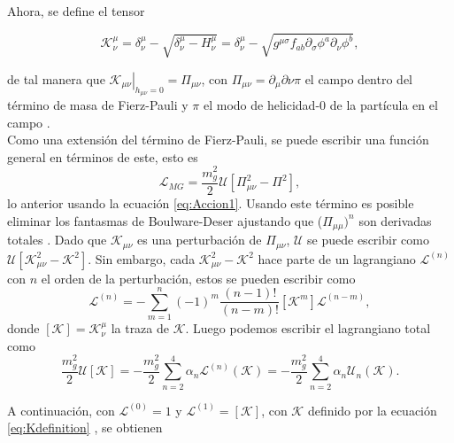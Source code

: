 Ahora, se define el tensor

\begin{equation}
    \mathcal{K}^\mu_\nu=\delta^\mu_\nu-\sqrt{\delta^\mu_\nu-H^\mu_\nu}=\delta^\mu_\nu-\sqrt{g^{\mu\sigma}f_{ab}\partial_\sigma\phi^a\partial_{\nu}\phi^{b}},\label{eq:Kdefinition}
\end{equation}

de tal manera que $\left.\mathcal{K}_{\mu\nu}\right|_{h_{\mu\nu}=0}=\Pi_{\mu\nu}$, con $\Pi_{\mu\nu}=\partial_\mu\partial\nu\pi$ el campo dentro del término de  masa de Fierz-Pauli y $\pi$ el modo de helicidad-0 de la partícula en el campo \cite{ResummationOfMG,GeneralizationOfFP}.\\

Como una extensión del término de Fierz-Pauli, se puede escribir una función general en términos de este, esto es
\begin{equation}
    \mathcal{L}_{MG}=\dfrac{m_g^2}{2}\mathcal{U}[\Pi_{\mu\nu}^2-\Pi^2],
\end{equation}
lo anterior usando la ecuación \eqref{eq:Accion1}. Usando este término es posible eliminar los fantasmas de Boulware-Deser ajustando que ($\Pi_{\mu\mu})^n$ son derivadas totales \cite{MassiveGravity}. Dado que $\mathcal{K}_{\mu\nu}$ es una perturbación de $\Pi_{\mu\nu}$, $\mathcal{U}$ se puede escribir como $\mathcal{U}[\mathcal{K}_{\mu\nu}^2-\mathcal{K}^2]$. Sin embargo, cada $\mathcal{K}_{\mu\nu}^2-\mathcal{K}^2$ hace parte de un lagrangiano $\mathcal{L}^{(n)}$ con $n$ el orden de la perturbación, estos se pueden escribir como \cite{GeneralizationOfFP}
\begin{equation}
    \mathcal{L}^{(n)}=-\sum\limits_{m=1}^n(-1)^m\dfrac{(n-1)!}{(n-m)!}[\mathcal{K}^m]\mathcal{L}^{(n-m)},
\end{equation}
donde $[\mathcal{K}]=\mathcal{K}^{\mu}_\nu$ la traza de $\mathcal{K}$. Luego podemos escribir el lagrangiano total como \cite{GeneralizationOfFP,ResummationOfMG}
\begin{equation}
    \dfrac{m_g^2}{2}\mathcal{U}[\mathcal{K}]=-\dfrac{m_g^2}{2}\sum\limits_{n=2}^4\alpha_n \mathcal{L}^{(n)}(\mathcal{K})=-\dfrac{m_g^2}{2}\sum\limits_{n=2}^4\alpha_n \mathcal{U}_n(\mathcal{K}).
    \label{eq:Udefinition}
\end{equation}

A continuación, con $\mathcal{L}^{(0)}=1$ y $\mathcal{L}^{(1)}=[\mathcal{K}]$, con $\mathcal{K}$ definido por la ecuación \eqref{eq:Kdefinition} \cite{ResummationOfMG}, se obtienen

